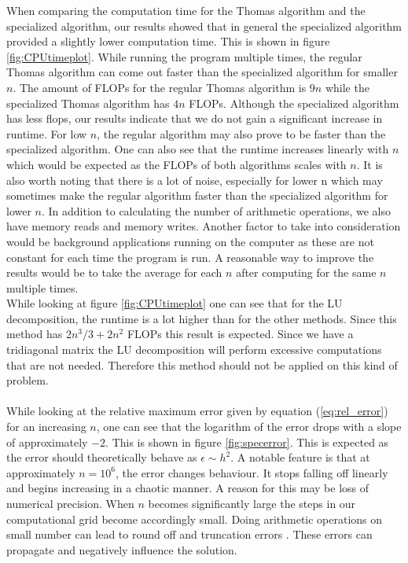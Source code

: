 \documentclass[twocolumn]{aastex62}
\begin{document}
When comparing the computation time for the Thomas algorithm and the specialized algorithm, our results showed that in general the specialized algorithm provided a slightly lower computation time. This is shown in figure \ref{fig:CPUtimeplot}.  While running the program multiple times, the regular Thomas algorithm can come out faster than the specialized algorithm for smaller $n$.  The amount of FLOPs for the regular Thomas algorithm is $9n$ while the specialized Thomas algorithm has $4n$ FLOPs. Although the specialized algorithm has less flops, our results indicate that we do not gain a significant increase in runtime. For low $n$, the regular algorithm may also prove to be faster than the specialized algorithm. One can also see that the runtime increases linearly with $n$ which would be expected as the FLOPs of both algorithms scales with $n$.  It is also worth noting that there is a lot of noise, especially for lower n which may sometimes make the regular algorithm faster than the specialized algorithm for lower $n$. In addition to calculating the number of arithmetic operations, we also have memory reads and memory writes. Another factor to take into consideration would be background applications running on the computer as these are not constant for each time the program is run. A reasonable way to improve the results would be to take the average for each $n$ after computing for the same $n$ multiple times.\\\indent
While looking at figure \ref{fig:CPUtimeplot} one can see that for the LU decomposition, the runtime is a lot higher than for the other methods. Since this method has $2n^3/3+2n^2$ FLOPs this result is expected. Since we have a tridiagonal matrix the LU decomposition will perform excessive computations that are not needed. Therefore this method should not be applied on this kind of problem.
\\\\\indent
While looking at the relative maximum error given by equation (\ref{eq:rel_error}) for an increasing $n$, one can see that the logarithm of the error drops with a slope of approximately $-2$. This is shown in figure \ref{fig:specerror}. This is expected as the error should theoretically behave as $\epsilon\sim h^2$.  A notable feature is that at approximately $n=10^6$, the error changes behaviour. It stops falling off linearly and begins increasing in a chaotic manner. A reason for this may be loss of numerical precision. When $n$ becomes significantly large the steps in our computational grid become accordingly small. Doing arithmetic operations on small number can lead to round off and truncation errors \citep[ch 4.2]{Morken:2017}. These errors can propagate and negatively influence the solution.\\\indent
\end{document}
